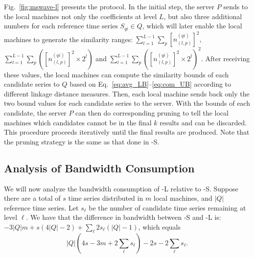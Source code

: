 Fig.~\ref{fig:mswave-l} presents the protocol. In the initial step,
the server $P$ sends to the local machines not only the coefficients
at level $L$, but also three additional numbers for each reference time
series $S_{qi} \in Q$, which will later enable the local machines to
generate the similarity ranges:
{\small
$\sum_{l=1}^{L-1}\sum_{p}[n_{(l,p)}^{(qi)}]^2$,
$\sum_{l=1}^{L-1}\sum_{p}([n_{(l,p)}^{(qi)}]^2 \times 2^{l})$
\textrm{and}
$\sum_{l=1}^{L-1}\sum_{p}([n_{(l,p)}^{(qi)}]^2 \times 2^{l})^2$.
}
%
After receiving these values, the local machines can compute the
similarity bounds of each candidate series to $Q$ based on
Eq.~\eqref{eq:avg_LB}--\eqref{eq:com_UB} according to different linkage
distance measures. Then, each local machine sends back only the two bound
values for each candidate series to the server. With the bounds of
each candidate, the server $P$ can then do corresponding pruning to
tell the local machines which candidates cannot be in the final $k$
results and can be discarded. This procedure proceeds iteratively until the
final results are produced. Note that the pruning strategy is the same
as that done in \MSWave-S{}.


\vspace{-0.1in}
\subsection{Analysis of Bandwidth Consumption}\label{subsec:analysis}

We will now analyze the bandwidth consumption of \MSWave-L{} relative to
\MSWave-S{}. Suppose there are a total of $s$ time series distributed in
$m$ local machines, and $|Q|$ reference time series.
Let $s_{\ell}$ be the number of candidate time series remaining at
level $\ell$.  We have that the difference in bandwidth between 
\MSWave-S{} and \MSWave-L{} is:
$-3|Q|m + s(4|Q|-2) + \sum_{\ell}{ 2s_{\ell}(|Q|-1) }$, which equals
{\small
\begin{equation}
|Q|( 4s -3m +2\sum_{\ell}{s_{\ell}} ) -2s - 2\sum_{\ell}{s_{\ell}}.
 \label{eq:bandwidthsaved}
\end{equation}
}

